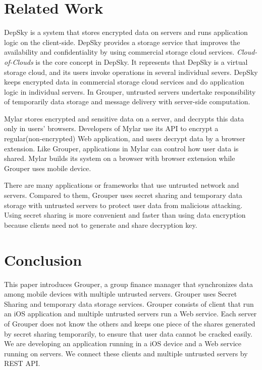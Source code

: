 \documentclass[twocolumn,10pt]{article}
\begin{document}
\section{Related Work}

DepSky\cite{bessani2013depsky} is a system that stores encrypted data on servers and runs application logic on the client-side. DepSky provides a storage service that improves the availability and confidentiality by using commercial storage cloud services. \emph{Cloud-of-Clouds} is the core concept in DepSky. It represents that DepSky is a virtual storage cloud, and its users invoke operations in several individual severs. DepSky keeps encrypted data in commercial storage cloud services and do application logic in individual servers. In Grouper,  untrusted servers undertake responsibility of temporarily data storage and message delivery with server-side computation.

Mylar\cite{popa2014building} stores encrypted and sensitive data on a server, and decrypts this data only in users’ browsers. Developers of Mylar use its API to encrypt a regular(non-encrypted) Web application, and users decrypt data by a browser extension. Like Grouper, applications in Mylar can control how user data is shared. Mylar builds its system on a browser with browser extension while Grouper uses mobile device.

There are many applications or frameworks that use untrusted network and servers. Compared to them, Grouper uses secret sharing and temporary data storage with untrusted servers to protect user data from malicious attacking. Using secret sharing is more convenient and faster than using data encryption because clients need not to generate and share decryption key.

\section{Conclusion}

This paper introduces Grouper, a group finance manager that synchronizes data among mobile devices with multiple untrusted servers. Grouper uses Secret Sharing and temporary data storage services. Grouper consists of client that run an iOS application and multiple untrusted servers run a Web service. Each server of Grouper does not know the others and keeps one piece of the shares generated by secret sharing temporarily, to ensure that user data cannot be cracked easily. We are developing an application running in a iOS device and a Web service running on servers. We connect these clients and multiple untrusted servers by REST API.


{
	\footnotesize
	
}
\end{document}
